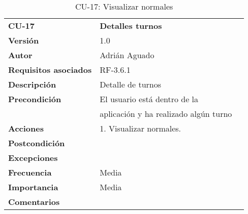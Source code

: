 \begin{table}[H]
\begin{tabular}{llr}  
\toprule
\begin{minipage}[b]{0.24\columnwidth}\raggedright\strut
\textbf{CU-17}\strut
\end{minipage} & \begin{minipage}[b]{0.72\columnwidth}\raggedright\strut
\textbf{Detalles turnos}\strut
\end{minipage}\tabularnewline
\cmidrule(r){1-2}
\textbf{Versión}       & 1.0           \\
\textbf{Autor}       & Adrián  Aguado    \\
\textbf{Requisitos asociados}       & RF-3.6.1  \\
\textbf{Descripción} & Detalle de turnos \\
\textbf{Precondición}  & El usuario está dentro de la \\
& aplicación y ha realizado algún turno   \\
\textbf{Acciones} & 1. Visualizar normales. \\
\textbf{Postcondición} &  \\
\textbf{Excepciones} &     \\
\textbf{Frecuencia} & Media          \\
\textbf{Importancia} & Media           \\
\textbf{Comentarios } &   \\
\bottomrule
\end{tabular}
\caption{CU-17: Visualizar normales} 
\end{table}

